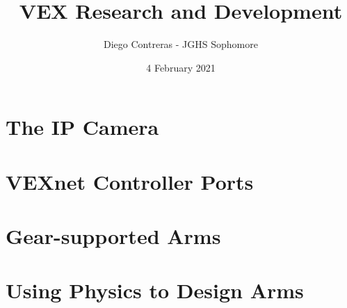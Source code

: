 \documentclass[12pt]{article}
\title{VEX Research and Development}
\author{Diego Contreras - JGHS Sophomore}
\date{4 February 2021}
\begin{document}
\maketitle
\newpage
\tableofcontents



\newpage
\section{The IP Camera}







\section{VEXnet Controller Ports}
\section{Gear-supported Arms}
\section{Using Physics to Design Arms}



\end{document}
